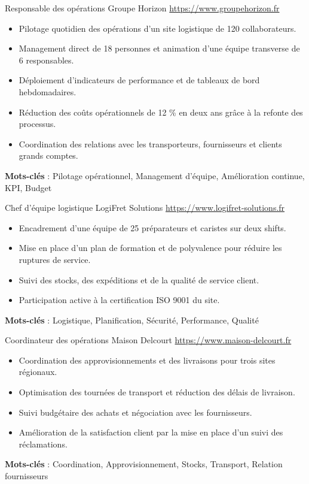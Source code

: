 \documentclass[a4paper, serif, 10pt]{moderncv}
\begin{document}
        {Responsable des opérations}
        {Groupe Horizon}
        {\url{https://www.groupehorizon.fr}}
        {}
        {\begin{itemize}
\item Pilotage quotidien des opérations d'un site logistique de 120 collaborateurs.
\item Management direct de 18 personnes et animation d'une équipe transverse de 6 responsables.
\item Déploiement d'indicateurs de performance et de tableaux de bord hebdomadaires.
\item Réduction des coûts opérationnels de 12 \% en deux ans grâce à la refonte des processus.
\item Coordination des relations avec les transporteurs, fournisseurs et clients grands comptes.
\end{itemize}
\textbf{Mots-clés} : Pilotage opérationnel, Management d'équipe, Amélioration continue, KPI, Budget}

        {Chef d'équipe logistique}
        {LogiFret Solutions}
        {\url{https://www.logifret-solutions.fr}}
        {}
        {\begin{itemize}
\item Encadrement d'une équipe de 25 préparateurs et caristes sur deux shifts.
\item Mise en place d'un plan de formation et de polyvalence pour réduire les ruptures de service.
\item Suivi des stocks, des expéditions et de la qualité de service client.
\item Participation active à la certification ISO 9001 du site.
\end{itemize}
\textbf{Mots-clés} : Logistique, Planification, Sécurité, Performance, Qualité}

        {Coordinateur des opérations}
        {Maison Delcourt}
        {\url{https://www.maison-delcourt.fr}}
        {}
        {\begin{itemize}
\item Coordination des approvisionnements et des livraisons pour trois sites régionaux.
\item Optimisation des tournées de transport et réduction des délais de livraison.
\item Suivi budgétaire des achats et négociation avec les fournisseurs.
\item Amélioration de la satisfaction client par la mise en place d'un suivi des réclamations.
\end{itemize}
\textbf{Mots-clés} : Coordination, Approvisionnement, Stocks, Transport, Relation fournisseurs}
\end{document}

